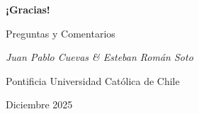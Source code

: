 \begin{frame}
  \centering
  \Huge \textcolor{celesteoscuro}{\textbf{¡Gracias!}}
  
  \vspace{1cm}
  
  \Large \textcolor{celesteprincipal}{Preguntas y Comentarios}
  
  \vspace{1.5cm}
  
  \normalsize
  \textit{Juan Pablo Cuevas \& Esteban Román Soto}
  
  \vspace{0.3cm}
  
  \small
  \textcolor{grisoscuro}{Pontificia Universidad Católica de Chile}
  
  \textcolor{grisoscuro}{Diciembre 2025}
\end{frame}
